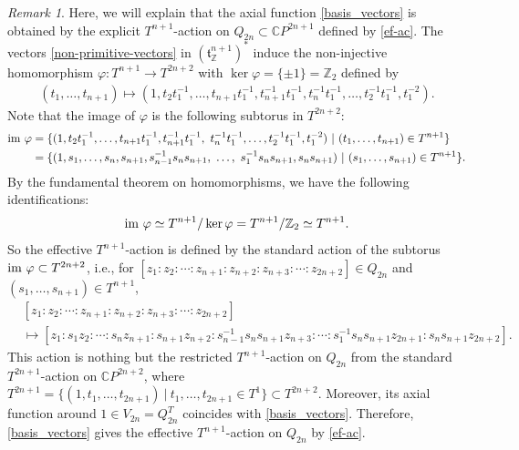 \documentclass[12pt]{amsart}
\theoremstyle{remark}
\newtheorem{remark}{Remark}[section]
\numberwithin{equation}{section}
\begin{document}
\begin{remark}
\label{pre-ex}
Here, we will explain that the axial function \eqref{basis_vectors} is obtained by the explicit $T^{n+1}$-action on $Q_{2n}\subset \mathbb{C}P^{2n+1}$ defined by \eqref{ef-ac}. 
The vectors \eqref{non-primitive-vectors} in $(\mathfrak{t}^{n+1}_{\mathbb{Z}})^{*}$ induce the non-injective homomorphism $\varphi:T^{n+1}\to T^{2n+2}$ with $\ker \varphi=\{\pm 1\}=\mathbb{Z}_{2}$ defined by 
\begin{align*}
(t_{1},\ldots, t_{n+1})\mapsto (1,t_{2}t_{1}^{-1},\ldots, t_{n+1}t_{1}^{-1}, t_{n+1}^{-1}t_{1}^{-1}, t_{n}^{-1}t_{1}^{-1},\ldots, t_{2}^{-1}t_{1}^{-1}, t_{1}^{-2}).
\end{align*}
Note that the image of $\varphi$ is the following subtorus in $T^{2n+2}$:
\begin{align*}
{\rm im}\ \varphi&=\{(1, t_{2}t_{1}^{-1},\ldots, t_{n+1}t_{1}^{-1}, t_{n+1}^{-1}t_{1}^{-1},\ t_{n}^{-1}t_{1}^{-1},\ldots, t_{2}^{-1}t_{1}^{-1},t_{1}^{-2})\ |\ (t_{1},\ldots, t_{n+1})\in T^{n+1}\} \\
&=\{(1, s_{1},\ldots, s_{n}, s_{n+1}, s_{n-1}^{-1}s_{n}s_{n+1},\ \ldots,\ s_{1}^{-1}s_{n}s_{n+1}, s_{n}s_{n+1})\ |\ (s_{1},\ldots, s_{n+1})\in T^{n+1}\}.
\end{align*}
By the fundamental theorem on homomorphisms, we have the following identifications:
\begin{align*}
{\rm im}\ \varphi\simeq T^{n+1}/\ker \varphi=T^{n+1}/\mathbb{Z}_{2}\simeq T^{n+1}.
\end{align*}
So the effective $T^{n+1}$-action is defined by the standard action of the subtorus ${\rm im} \ \varphi\subset T^{2n+2}$, i.e., for $[z_{1}:z_{2}:\cdots :z_{n+1}:z_{n+2}: z_{n+3}:\cdots :z_{2n+2}]\in Q_{2n}$ and $(s_{1},\ldots ,s_{n+1})\in T^{n+1}$, 
\begin{align}
\label{ef-ac}
&[z_{1}:z_{2}:\cdots :z_{n+1}:z_{n+2}: z_{n+3}:\cdots :z_{2n+2}] \\
&\mapsto 
[z_{1}:s_{1}z_{2}:\cdots :s_{n}z_{n+1}:s_{n+1}z_{n+2}: s_{n-1}^{-1}s_{n}s_{n+1}z_{n+3}:\cdots : s_{1}^{-1}s_{n}s_{n+1}z_{2n+1}: s_{n}s_{n+1}z_{2n+2}]. \nonumber
\end{align}
This action is nothing but the restricted $T^{n+1}$-action on $Q_{2n}$ from the standard $T^{2n+1}$-action on $\mathbb{C}P^{2n+2}$, where $T^{2n+1}=\{(1,t_{1},\ldots, t_{2n+1})\ |\ t_{1},\ldots, t_{2n+1}\in T^{1}\}\subset T^{2n+2}$.
Moreover, its axial function around $1\in V_{2n}=Q_{2n}^{T}$ coincides with \eqref{basis_vectors}.
Therefore, \eqref{basis_vectors} gives the effective $T^{n+1}$-action on $Q_{2n}$ by \eqref{ef-ac}.
\end{remark}
\end{document}

